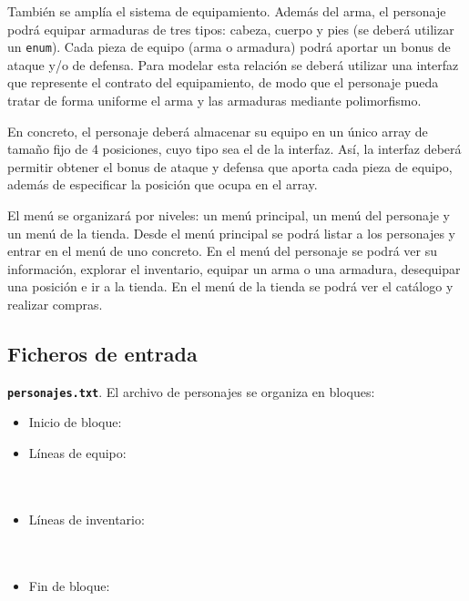 \documentclass[11pt,a4paper]{article}
\begin{document}
También se amplía el sistema de equipamiento. Además del arma, el personaje podrá equipar armaduras de tres tipos: cabeza, cuerpo y pies (se deberá utilizar un \texttt{enum}). Cada pieza de equipo (arma o armadura) podrá aportar un bonus de ataque y/o de defensa. Para modelar esta relación se deberá utilizar una interfaz que represente el contrato del equipamiento, de modo que el personaje pueda tratar de forma uniforme el arma y las armaduras mediante polimorfismo.

En concreto, el personaje deberá almacenar su equipo en un único array de tamaño fijo de 4 posiciones, cuyo tipo sea el de la interfaz. Así, la interfaz deberá permitir obtener el bonus de ataque y defensa que aporta cada pieza de equipo, además de especificar la posición que ocupa en el array.

El menú se organizará por niveles: un menú principal, un menú del personaje y un menú de la tienda. Desde el menú principal se podrá listar a los personajes y entrar en el menú de uno concreto. En el menú del personaje se podrá ver su información, explorar el inventario, equipar un arma o una armadura, desequipar una posición e ir a la tienda. En el menú de la tienda se podrá ver el catálogo y realizar compras.


\subsection{Ficheros de entrada}

\textbf{\texttt{personajes.txt}}. El archivo de personajes se organiza en bloques:
\begin{itemize}[noitemsep, topsep=0pt]
    \item Inicio de bloque: 
    \item Líneas de equipo:\\
    \\
    \\
    \item Líneas de inventario:\\
    \\
    \\
    \item Fin de bloque: 
\end{itemize}
\end{document}
